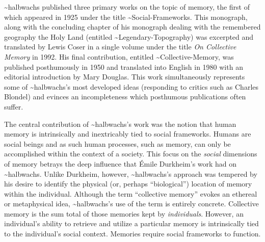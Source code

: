 \textasciitilde{}halbwachs published three primary works on the topic of
memory, the first of which appeared in 1925 under the title
\textasciitilde{}Social-Frameworks.\autocite{halbwachs1925} This
monograph, along with the concluding chapter of his monograph dealing
with the remembered geography the Holy Land (entitled
\textasciitilde{}Legendary-Topography) was excerpted and translated by
Lewis Coser in a single volume under the title \emph{On Collective
Memory} in 1992.\autocites[Several of the most important chapters of
\textasciitilde{}social-frameworks were included in full. Likewise, the
entirety of the conclusion of \textasciitilde{}legendary-topography was
included][]{halbwachs1992}{halbwachs1941} His final contribution,
entitled \textasciitilde{}Collective-Memory, was published posthumously
in 1950 and translated into English in 1980 with an editorial
introduction by Mary Douglas.\autocite{halbwachs1980} This work
simultaneously represents some of \textasciitilde{}halbwachs's most
developed ideas (responding to critics such as Charles Blondel) and
evinces an incompleteness which posthumous publications often
suffer.\autocites{halbwachs1980}[As Coser observes, ``One may doubt that
the author himself would have been willing to publish it in what seems
to be an unfinished state. The book nevertheless contains many further
developments of \textasciitilde{}halbwachs's thought in regard to such
matters as the relation of space and time to collective memory as well
as fruitful definitions and applications of the differences between
individual, collective, and historical
memory.''][2]{coser_halbwachs1992}

The central contribution of \textasciitilde{}halbwachs's work was the
notion that human memory is intrinsically and inextricably tied to
social frameworks. Humans are social beings and as such human processes,
such as memory, can only be accomplished within the context of a
society. This focus on the \emph{social} dimensions of memory betrays
the deep influence that Émile Durkheim's work had on
\textasciitilde{}halbwachs. Unlike Durkheim, however,
\textasciitilde{}halbwachs's approach was tempered by his desire to
identify the physical (or, perhaps ``biological'') location of memory
within the individual. Although the term ``collective memory'' evokes an
ethereal or metaphysical idea, \textasciitilde{}halbwachs's use of the
term is entirely concrete. Collective memory is the sum total of those
memories kept by \emph{individuals}. However, an individual's ability to
retrieve and utilize a particular memory is intrinsically tied to the
individual's social context. Memories require social frameworks to
function.\autocite[38]{halbwachs1992}

